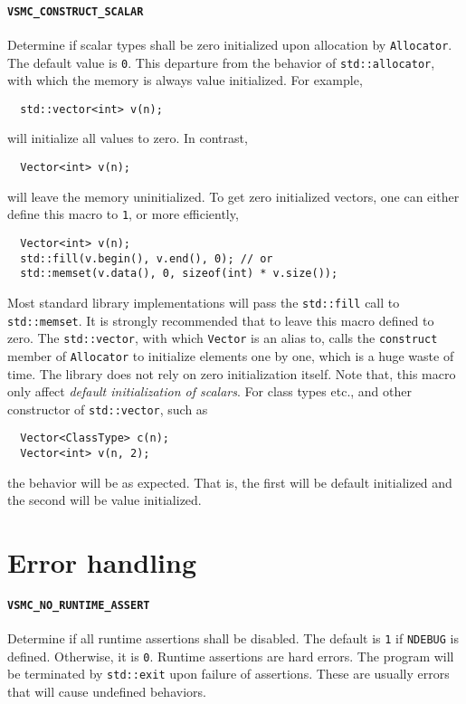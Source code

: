 \paragraph{\texttt{VSMC\_CONSTRUCT\_SCALAR}} Determine if scalar types shall be
zero initialized upon allocation by \verb|Allocator|. The default value is
\verb|0|. This departure from the behavior of \verb|std::allocator|, with which
the memory is always value initialized. For example,
\begin{Verbatim}
  std::vector<int> v(n);
\end{Verbatim}
will initialize all values to zero. In contrast,
\begin{Verbatim}
  Vector<int> v(n);
\end{Verbatim}
will leave the memory uninitialized. To get zero initialized vectors, one can
either define this macro to \verb|1|, or more efficiently,
\begin{Verbatim}
  Vector<int> v(n);
  std::fill(v.begin(), v.end(), 0); // or
  std::memset(v.data(), 0, sizeof(int) * v.size());
\end{Verbatim}
Most standard library implementations will pass the \verb|std::fill| call to
\verb|std::memset|. It is strongly recommended that to leave this macro
defined to zero. The \verb|std::vector|, with which \verb|Vector| is an alias
to, calls the \verb|construct| member of \verb|Allocator| to initialize
elements one by one, which is a huge waste of time. The library does not rely
on zero initialization itself. Note that, this macro only affect
\emph{default initialization of scalars}. For class types etc., and other
constructor of \verb|std::vector|, such as
\begin{Verbatim}
  Vector<ClassType> c(n);
  Vector<int> v(n, 2);
\end{Verbatim}
the behavior will be as expected. That is, the first will be default
initialized and the second will be value initialized.

\section{Error handling}
\label{sec:Error handling}

\paragraph{\texttt{VSMC\_NO\_RUNTIME\_ASSERT}} Determine if all runtime
assertions shall be disabled. The default is \verb|1| if \verb|NDEBUG| is
defined. Otherwise, it is \verb|0|. Runtime assertions are hard errors. The
program will be terminated by \verb|std::exit| upon failure of assertions.
These are usually errors that will cause undefined behaviors.


